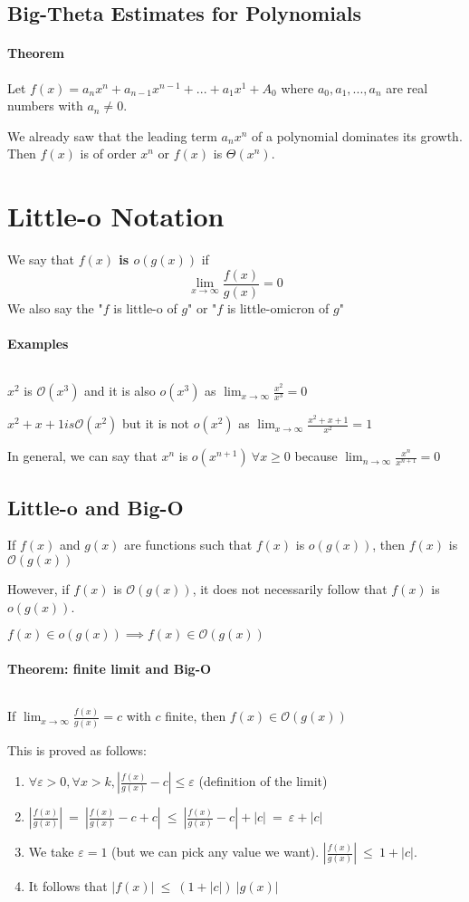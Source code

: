 \documentclass[10pt,a4paper]{book}
\begin{document}
\subsection{Big-Theta Estimates for Polynomials}
\paragraph*{Theorem}
Let $f(x)=a_nx^n+a_{n-1}x^{n-1}+...+a_1x^1+A_0$ where $a_0,a_1,...,a_n$ are real numbers with $a_n \neq 0$.\par
We already saw that the leading term $a_nx^n$ of a polynomial dominates its growth. Then $f(x)$ is of order $x^n$ or $f(x)$ is $\Theta (x^n)$.
\section{Little-o Notation}
We say that \textbf{$f(x)$ is $o (g(x))$} if \[ \lim_{x\to\infty} \frac{f(x)}{g(x)} = 0 \]
We also say the "$f$ is little-o of $g$" or "$f$ is little-omicron of $g$"
\paragraph*{Examples}
$\ $\par
$x^2$ is $\mathcal{O}(x^3)$ and it is also $o(x^3)$ as $\lim_{x\to \infty} \frac{x^2}{x^3} = 0$\par
$x^2+x+1 is \mathcal{O}(x^2)$ but it is not $o(x^2)$ as $\lim_{x\to \infty} \frac{x^2+x+1}{x^2} =1$\par 
In general, we can say that $x^n$ is $o(x^{n+1})\ \forall x \geq 0$ because $\lim_{n\to \infty} \frac{x^n}{x^{n+1}} =0$
\subsection{Little-o and Big-O}
If $f(x)$ and $g(x)$ are functions such that $f(x)$ is $o(g(x))$, then $f(x)$ is $\mathcal{O}(g(x))$\par 
However, if $f(x)$ is $\mathcal{O}(g(x))$, it does not necessarily follow that $f(x)$ is $o(g(x))$.\par 
$f(x) \in o(g(x)) \implies f(x) \in \mathcal{O}(g(x))$
\paragraph*{Theorem: finite limit and Big-O}
$\ $\par 
If $\lim_{x\to \infty} \frac{f(x)}{g(x)}=c$ with $c$ finite, then $f(x) \in \mathcal{O}(g(x))$\par 
This is proved as follows:
\begin{enumerate}
\item $\forall \varepsilon >0, \forall x>k, |\frac{f(x)}{g(x)} -c| \leqslant \varepsilon$ (definition of the limit)
\item $|\frac{f(x)}{g(x)}| \ =\ |\frac{f(x)}{g(x)} -c +c| \ \leqslant \ |\frac{f(x)}{g(x)} -c| + |c|\ =\ \varepsilon+|c|$
\item We take $\varepsilon = 1$ (but we can pick any value we want). $|\frac{f(x)}{g(x)}|\ \leqslant \ 1+|c|$.
\item It follows that $|f(x)|\ \leqslant \ (1+|c|)\ |g(x)|$
\end{enumerate}
\end{document}
